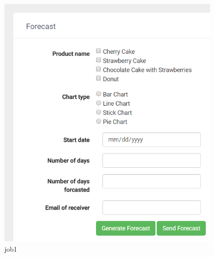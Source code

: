 \documentclass[a4paper,11pt,twoside]{report}
\theoremstyle{definition}
\begin{document}
\begin{figure}[h!]
\begin{center}
\includegraphics[width=\textwidth]{AS/report/2}
\end{center}
\caption{job1}
\end{figure}
\thispagestyle{empty}
\end{document}
